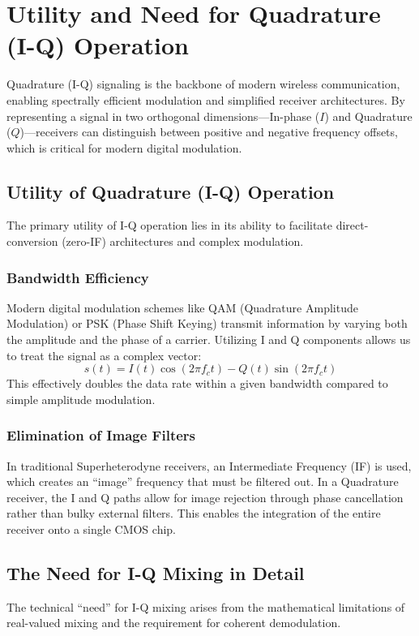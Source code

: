 \documentclass[conference]{IEEEtran}
\begin{document}
\section{Utility and Need for Quadrature (I-Q) Operation}
Quadrature (I-Q) signaling is the backbone of modern wireless communication, enabling spectrally efficient modulation and simplified receiver architectures. By representing a signal in two orthogonal dimensions—In-phase ($I$) and Quadrature ($Q$)—receivers can distinguish between positive and negative frequency offsets, which is critical for modern digital modulation.

\subsection{Utility of Quadrature (I-Q) Operation}
The primary utility of I-Q operation lies in its ability to facilitate direct-conversion (zero-IF) architectures and complex modulation.

\subsubsection{Bandwidth Efficiency}
Modern digital modulation schemes like QAM (Quadrature Amplitude Modulation) or PSK (Phase Shift Keying) transmit information by varying both the amplitude and the phase of a carrier. Utilizing I and Q components allows us to treat the signal as a complex vector:
\begin{equation}
s(t) = I(t)\cos(2\pi f_c t) - Q(t)\sin(2\pi f_c t)
\end{equation}
This effectively doubles the data rate within a given bandwidth compared to simple amplitude modulation.

\subsubsection{Elimination of Image Filters}
In traditional Superheterodyne receivers, an Intermediate Frequency (IF) is used, which creates an ``image'' frequency that must be filtered out. In a Quadrature receiver, the I and Q paths allow for image rejection through phase cancellation rather than bulky external filters. This enables the integration of the entire receiver onto a single CMOS chip.

\subsection{The Need for I-Q Mixing in Detail}
The technical ``need'' for I-Q mixing arises from the mathematical limitations of real-valued mixing and the requirement for coherent demodulation.
\end{document}
